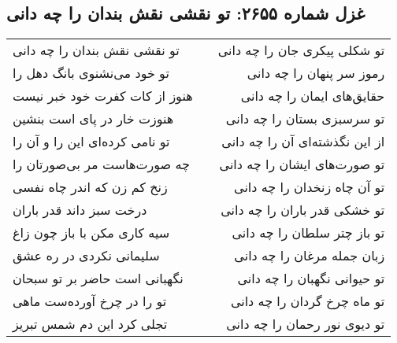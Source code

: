 \begin{center}
\section*{غزل شماره ۲۶۵۵: تو نقشی نقش بندان را چه دانی}
\label{sec:2655}
\begin{longtable}{l p{0.5cm} r}
تو نقشی نقش بندان را چه دانی
&&
تو شکلی پیکری جان را چه دانی
\\
تو خود می‌نشنوی بانگ دهل را
&&
رموز سر پنهان را چه دانی
\\
هنوز از کات کفرت خود خبر نیست
&&
حقایق‌های ایمان را چه دانی
\\
هنوزت خار در پای است بنشین
&&
تو سرسبزی بستان را چه دانی
\\
تو نامی کرده‌ای این را و آن را
&&
از این نگذشته‌ای آن را چه دانی
\\
چه صورت‌هاست مر بی‌صورتان را
&&
تو صورت‌های ایشان را چه دانی
\\
زنخ کم زن که اندر چاه نفسی
&&
تو آن چاه زنخدان را چه دانی
\\
درخت سبز داند قدر باران
&&
تو خشکی قدر باران را چه دانی
\\
سیه کاری مکن با باز چون زاغ
&&
تو باز چتر سلطان را چه دانی
\\
سلیمانی نکردی در ره عشق
&&
زبان جمله مرغان را چه دانی
\\
نگهبانی است حاضر بر تو سبحان
&&
تو حیوانی نگهبان را چه دانی
\\
تو را در چرخ آورده‌ست ماهی
&&
تو ماه چرخ گردان را چه دانی
\\
تجلی کرد این دم شمس تبریز
&&
تو دیوی نور رحمان را چه دانی
\\
\end{longtable}
\end{center}
